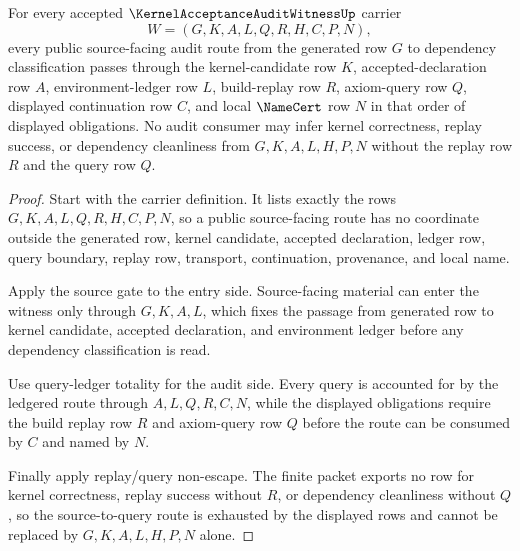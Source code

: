 \begin{theorem}
\label{thm:kernel-acceptance-audit-witness-source-query-route-exhaustion}
For every accepted $\KernelAcceptanceAuditWitnessUp$ carrier
$$
W=(G,K,A,L,Q,R,H,C,P,N),
$$
every public source-facing audit route from the generated row $G$ to dependency classification passes through the kernel-candidate row $K$, accepted-declaration row $A$, environment-ledger row $L$, build-replay row $R$, axiom-query row $Q$, displayed continuation row $C$, and local $\NameCert$ row $N$ in that order of displayed obligations. No audit consumer may infer kernel correctness, replay success, or dependency cleanliness from $G,K,A,L,H,P,N$ without the replay row $R$ and the query row $Q$.
\end{theorem}
\begin{proof}
Start with the carrier definition. It lists exactly the rows $G,K,A,L,Q,R,H,C,P,N$, so a public source-facing route has no coordinate outside the generated row, kernel candidate, accepted declaration, ledger row, query boundary, replay row, transport, continuation, provenance, and local name.

Apply the source gate to the entry side. Source-facing material can enter the witness only through $G,K,A,L$, which fixes the passage from generated row to kernel candidate, accepted declaration, and environment ledger before any dependency classification is read.

Use query-ledger totality for the audit side. Every query is accounted for by the ledgered route through $A,L,Q,R,C,N$, while the displayed obligations require the build replay row $R$ and axiom-query row $Q$ before the route can be consumed by $C$ and named by $N$.

Finally apply replay/query non-escape. The finite packet exports no row for kernel correctness, replay success without $R$, or dependency cleanliness without $Q$, so the source-to-query route is exhausted by the displayed rows and cannot be replaced by $G,K,A,L,H,P,N$ alone.
\end{proof}

